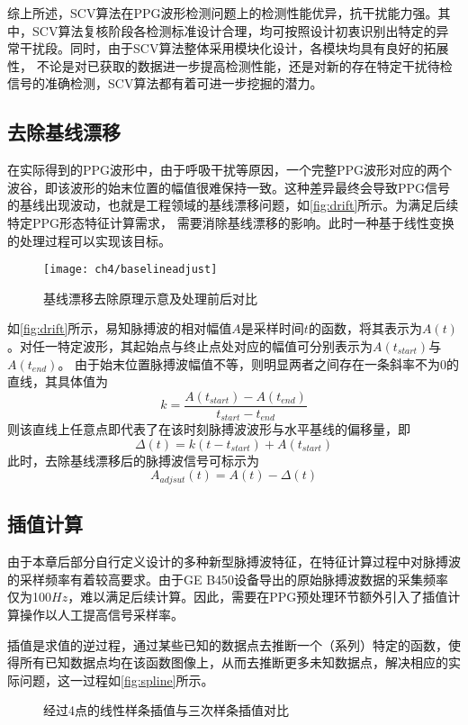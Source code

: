 综上所述，SCV算法在PPG波形检测问题上的检测性能优异，抗干扰能力强。其中，SCV算法复核阶段各检测标准设计合理，均可按照设计初衷识别出特定的异常干扰段。同时，由于SCV算法整体采用模块化设计，各模块均具有良好的拓展性，
不论是对已获取的数据进一步提高检测性能，还是对新的存在特定干扰待检信号的准确检测，SCV算法都有着可进一步挖掘的潜力。

\subsection{去除基线漂移}
在实际得到的PPG波形中，由于呼吸干扰等原因，一个完整PPG波形对应的两个波谷，即该波形的始末位置的幅值很难保持一致。这种差异最终会导致PPG信号的基线出现波动，也就是工程领域的基线漂移问题，如\autoref{fig:drift}所示。为满足后续特定PPG形态特征计算需求，
需要消除基线漂移的影响。此时一种基于线性变换的处理过程可以实现该目标。
\begin{figure}[htbp]
    \centering
    \texttt{[image: ch4/baselineadjust]}
    \caption{\label{fig:drift}基线漂移去除原理示意及处理前后对比}
\end{figure}

如\autoref{fig:drift}所示，易知脉搏波的相对幅值$A$是采样时间$t$的函数，将其表示为$A(t)$。对任一特定波形，其起始点与终止点处对应的幅值可分别表示为$A(t_{start})$与$A(t_{end})$。
由于始末位置脉搏波幅值不等，则明显两者之间存在一条斜率不为0的直线，其具体值为
\begin{equation}
    \label{equ:linek}
    k=\frac{A(t_{start})-A(t_{end})}{t_{start}-t_{end}}
\end{equation}
则该直线上任意点即代表了在该时刻脉搏波波形与水平基线的偏移量，即
\begin{equation}
    \label{equ:liney}
    \Delta(t)=k(t-t_{start})+A(t_{start})
\end{equation}
此时，去除基线漂移后的脉搏波信号可标示为
\begin{equation}
    \label{equ:adjusta}
    A_{adjsut}(t)=A(t)-\Delta(t)
\end{equation}

\subsection{插值计算}
由于本章后部分自行定义设计的多种新型脉搏波特征，在特征计算过程中对脉搏波的采样频率有着较高要求。由于GE B450设备导出的原始脉搏波数据的采集频率仅为100$Hz$，难以满足后续计算。因此，需要在PPG预处理环节额外引入了插值计算操作以人工提高信号采样率。

插值是求值的逆过程，通过某些已知的数据点去推断一个（系列）特定的函数，使得所有已知数据点均在该函数图像上，从而去推断更多未知数据点，解决相应的实际问题，这一过程如\autoref{fig:spline}所示。
\begin{figure}[htbp]
    \centering
    \quad
    \caption{\label{fig:spline}经过4点的线性样条插值与三次样条插值对比}
\end{figure}


